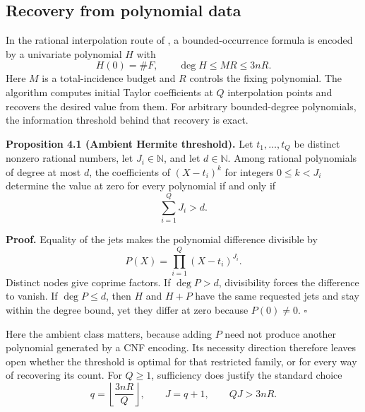 \documentclass[11pt,letterpaper]{article}
\newenvironment{manualstatement}{%
  \par\addvspace{0.7\baselineskip}\begingroup\itshape\noindent\ignorespaces
}{\par\endgroup\addvspace{0.4\baselineskip}}
\newenvironment{manualproof}{%
  \par\addvspace{0.4\baselineskip}\begingroup\normalfont\noindent\ignorespaces
}{\par\endgroup\addvspace{0.5\baselineskip}}
\begin{document}
\subsection{Recovery from polynomial
data}\label{recovery-from-polynomial-data}

In the rational interpolation route of \citep[Sections 2.4--2.7]{O26}, a
bounded-occurrence formula is encoded by a univariate polynomial \(H\)
with \[H(0)=\#F,\qquad \deg H\le MR\le3nR.\] Here \(M\) is a
total-incidence budget and \(R\) controls the fixing polynomial. The
algorithm computes initial Taylor coefficients at \(Q\) interpolation
points and recovers the desired value from them. For arbitrary
bounded-degree polynomials, the information threshold behind that
recovery is exact.

\begin{manualstatement}

{{\upshape \textbf{Proposition 4.1 (Ambient Hermite threshold).}}} Let
\(t_1,\ldots,t_Q\) be distinct nonzero rational numbers, let
\(J_i\in\mathbb N\), and let \(d\in\mathbb N\). Among rational
polynomials of degree at most \(d\), the coefficients of \((X-t_i)^k\)
for integers \(0\le k<J_i\) determine the value at zero for every
polynomial if and only if \[\sum_{i=1}^Q J_i>d.\]

\end{manualstatement}

\begin{manualproof}

\textbf{Proof.} Equality of the jets makes the polynomial difference
divisible by \[P(X)=\prod_{i=1}^Q(X-t_i)^{J_i}.\] Distinct nodes give
coprime factors. If \(\deg P>d\), divisibility forces the difference to
vanish. If \(\deg P\le d\), then \(H\) and \(H+P\) have the same
requested jets and stay within the degree bound, yet they differ at zero
because \(P(0)\ne0\). \(\square\)

\end{manualproof}

Here the ambient class matters, because adding \(P\) need not produce
another polynomial generated by a CNF encoding. Its necessity direction
therefore leaves open whether the threshold is optimal for that
restricted family, or for every way of recovering its count. For
\(Q\ge1\), sufficiency does justify the standard choice
\[q=\left\lfloor\frac{3nR}{Q}\right\rfloor,
\qquad J=q+1,
\qquad QJ>3nR.\]
\end{document}
